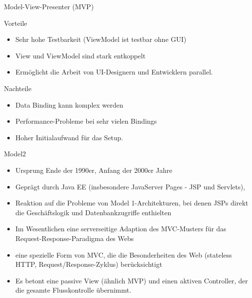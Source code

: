 \begin{frame}{Model-View-Presenter (MVP)}
	\begin{exampleblock}{Vorteile}
		\begin{itemize}
		  \item Sehr hohe Testbarkeit (ViewModel ist testbar ohne GUI)
		  \item View und ViewModel sind stark entkoppelt
		  \item Ermöglicht die Arbeit von UI-Designern und Entwicklern parallel.
		\end{itemize} 
	\end{exampleblock}
	\pause
	\begin{alertblock}{Nachteile}
		\begin{itemize}
		  \item Data Binding kann komplex werden
		  \item Performance-Probleme bei sehr vielen Bindings
		  \item Hoher Initialaufwand für das Setup.
		\end{itemize}
	\end{alertblock}
\end{frame}


\begin{frame}{Model2}
	\begin{itemize}
	  \item Ursprung Ende der 1990er, Anfang der 2000er Jahre
	  \item Geprägt durch Java EE (insbesondere JavaServer Pages - JSP und Servlets),
	  \item Reaktion auf die Probleme von Model 1-Architekturen, bei denen JSPs direkt die Geschäftslogik und Datenbankzugriffe enthielten
	  \item Im Wesentlichen eine serverseitige Adaption des MVC-Musters für das Request-Response-Paradigma des Webs
	  \item eine spezielle Form von MVC, die die Besonderheiten des Web (stateless HTTP, Request/Response-Zyklus) berücksichtigt
	  \item Es betont eine passive View (ähnlich MVP) und einen aktiven Controller, der die gesamte Flusskontrolle übernimmt.
	\end{itemize}
\end{frame}

